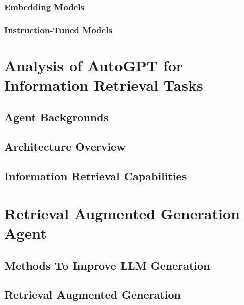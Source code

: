 \documentclass[english, version-2022-01]{uzl-thesis}
\begin{document}
\subsection{Embedding Models}
\label{subsec:embedding}


\subsection{Instruction-Tuned Models}


\chapter{Analysis of AutoGPT for Information Retrieval Tasks}


\section{Agent Backgrounds}


\section{Architecture Overview}


\section{Information Retrieval Capabilities}


\chapter{Retrieval Augmented Generation Agent}


\section{Methods To Improve LLM Generation}


\section{Retrieval Augmented Generation}

\end{document}
